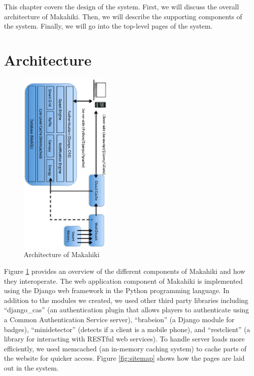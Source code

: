 This chapter covers the design of the system. First, we will discuss the overall architecture of Makahiki. Then, we will describe the supporting components of the system. Finally, we will go into the top-level pages of the system.

\section{Architecture}
\label{makahiki:architecture}

\begin{figure}[h]
  \center
  \includegraphics[width=0.4\textwidth, angle=90]{images/makahiki-architecture.eps}
  \caption{Architecture of Makahiki}
  \label{fig:MakahikiArchitecture}
\end{figure}

Figure \ref{fig:MakahikiArchitecture} provides an overview of the different components of Makahiki and how they interoperate. The web application component of Makahiki is implemented using the Django web framework in the Python programming language. In addition to the modules we created, we used other third party libraries including ``django\_cas'' (an authentication plugin that allows players to authenticate using a Common Authentication Service server), ``brabeion'' (a Django module for badges), ``minidetector'' (detects if a client is a mobile phone), and ``restclient'' (a library for interacting with RESTful web services). To handle server loads more efficiently, we used memcached (an in-memory caching system) to cache parts of the website for quicker access. Figure \ref{fig:sitemap} shows how the pages are laid out in the system.

